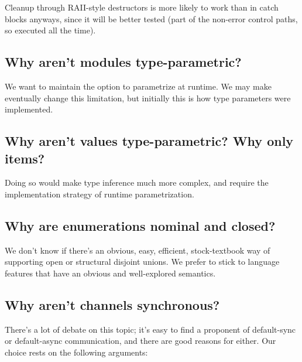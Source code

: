 \documentclass[]{article}
\begin{document}
Cleanup through RAII-style destructors is more likely to work than in
catch blocks anyways, since it will be better tested (part of the
non-error control paths, so executed all the time).

\subsection{Why aren't modules
type-parametric?}\label{why-arent-modules-type-parametric}

We want to maintain the option to parametrize at runtime. We may make
eventually change this limitation, but initially this is how type
parameters were implemented.

\subsection{Why aren't values type-parametric? Why only
items?}\label{why-arent-values-type-parametric-why-only-items}

Doing so would make type inference much more complex, and require the
implementation strategy of runtime parametrization.

\subsection{Why are enumerations nominal and
closed?}\label{why-are-enumerations-nominal-and-closed}

We don't know if there's an obvious, easy, efficient, stock-textbook way
of supporting open or structural disjoint unions. We prefer to stick to
language features that have an obvious and well-explored semantics.

\subsection{Why aren't channels
synchronous?}\label{why-arent-channels-synchronous}

There's a lot of debate on this topic; it's easy to find a proponent of
default-sync or default-async communication, and there are good reasons
for either. Our choice rests on the following arguments:
\end{document}
